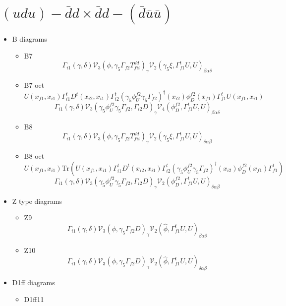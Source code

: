 \documentclass{article}[12pt]
\begin{document}
\section{$(udu)-\bar{d}d \times \bar{d}d-(\bar{d}\bar{u}\bar{u}) $}
\begin{itemize}
\item B diagrams
\begin{itemize}
\item B7
$$
\Gamma_{i1}\left(\gamma,\delta\right){\mathcal V}_3\left(\phi,\gamma_5\Gamma_{f2}T^{dd}_{fii}\right)_\gamma
{\mathcal V}_2\left(\gamma_5\xi,\Gamma_{f1}^tU,U\right)_{\beta\alpha\delta}
$$
\item B7 oet
$$
U(x_{f1},x_{i1})\Gamma_{i1}^tD^{t}(x_{i2},x_{i1})\Gamma_{i2}^t(\gamma_5\phi_U^{f2}\gamma_5\Gamma_{f2})^{\dagger}(x_{i2})\phi_D^{f2}(x_{f1})\Gamma_{f1}^tU(x_{f1},x_{i1})
$$
$$
\Gamma_{i1}\left(\gamma,\delta\right){\mathcal V}_3\left(\gamma_5\phi_U^{f2}\gamma_5\Gamma_{f2},\Gamma_{i2}D\right)_{\gamma}
{\mathcal V}_4\left(\phi_D^{f2},\Gamma_{f1}^tU,U\right)_{\beta\alpha\delta}
$$
\item B8
$$
\Gamma_{i1}\left(\gamma,\delta\right){\mathcal V}_3\left(\phi,\gamma_5\Gamma_{f2}T^{dd}_{fii}\right)_\gamma
{\mathcal V}_2\left(\gamma_5\xi,\Gamma_{f1}^tU,U\right)_{\delta\alpha\beta}
$$
\item B8 oet
$$
U(x_{f1},x_{i1})\mathrm{Tr}(U(x_{f1},x_{i1})\Gamma_{i1}^tD^t(x_{i2},x_{i1})\Gamma_{i2}^t(\gamma_5\phi_U^{f2}\gamma_5\Gamma_{f2})^{\dagger}(x_{i2})\phi_D^{f2}(x_{f1})\Gamma_{f1}^t)
$$
$$
\Gamma_{i1}\left(\gamma,\delta\right){\mathcal V}_3\left(\gamma_5\phi_U^{f2}\gamma_5\Gamma_{f2},\Gamma_{i2}D\right)_{\gamma}
{\mathcal V}_2\left(\phi_D^{f2},\Gamma_{f1}^tU,U\right)_{\delta\alpha\beta}
$$
\end{itemize}
\item Z type diagrams
\begin{itemize}
\item Z9
$$
\Gamma_{i1}\left(\gamma,\delta\right){\mathcal V}_3\left(\phi,\gamma_5\Gamma_{f2}D\right)_\gamma
{\mathcal V}_2\left(\hat{\phi},\Gamma_{f1}^tU,U\right)_{\beta\alpha\delta}
$$
\item Z10
$$
\Gamma_{i1}\left(\gamma,\delta\right){\mathcal V}_3\left(\phi,\gamma_5\Gamma_{f2}D\right)_\gamma
{\mathcal V}_2\left(\hat{\phi},\Gamma_{f1}^tU,U\right)_{\delta\alpha\beta}
$$
\end{itemize}
\item D1ff diagrams
\begin{itemize}
\item D1ff11

\end{itemize}
\end{itemize}
\end{document}
